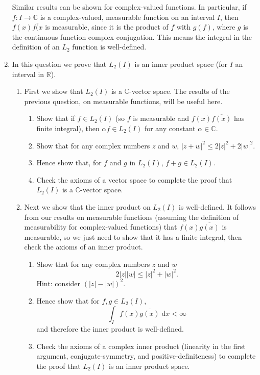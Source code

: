\documentclass{article}
\newcommand{\diff}{\;\mathrm{d}}
\begin{document}
\begin{enumerate}
		Similar results can be shown for complex-valued functions. In particular, if $f:I\to \mathbb{C}$ is a complex-valued, measurable function on an interval $I$, then $f(x)\overline{f(x}$ is measurable, since it is the product of $f$ with $g(f)$, where $g$ is the continuous function complex-conjugation. This means the integral in the definition of an $L_2$ function is well-defined.
	\item In this question we prove that $L_2(I)$ is an inner product space (for $I$ an interval in $\mathbb{R}$).
		\begin{enumerate}
			\item First we show that $L_2(I)$ is a $\mathbb{C}$-vector space. The results of the previous question, on measurable functions, will be useful here.
				\begin{enumerate}
					\item Show that if $f\in L_2(I)$ (so $f$ is measurable and $f(x)\overline{f(x)}$ has finite integral), then $\alpha f\in L_2(I)$ for any constant $\alpha\in \mathbb{C}$.
					\item Show that for any complex numbers $z$ and $w$, $|z+w|^2\leq 2|z|^2 + 2|w|^2$.
					\item Hence show that, for $f$ and $g$ in $L_2(I)$, $f+g\in L_2(I)$.
					\item Check the axioms of a vector space to complete the proof that $L_2(I)$ is a $\mathbb{C}$-vector space.
				\end{enumerate}
			\item Next we show that the inner product on $L_2(I)$ is well-defined. It follows from our results on measurable functions (assuming the definition of measurability for complex-valued functions) that $f(x)\overline{g(x)}$ is measurable, so we just need to show that it has a finite integral, then check the axioms of an inner product.
				\begin{enumerate}
					\item Show that for any complex numbers $z$ and $w$
						\[2|z||w|\leq |z|^2+|w|^2.\]
						Hint: consider $\left(|z|-|w|\right)^2$.
					\item Hence show that for $f,g\in L_2(I)$,
						\[\int_I f(x)\overline{g(x)}\diff x < \infty\]
						and therefore the inner product is well-defined.
					\item Check the axioms of a complex inner product (linearity in the first argument, conjugate-symmetry, and positive-definiteness) to complete the proof that $L_2(I)$ is an inner product space.
				\end{enumerate}

\end{enumerate}
\end{enumerate}
\end{document}
